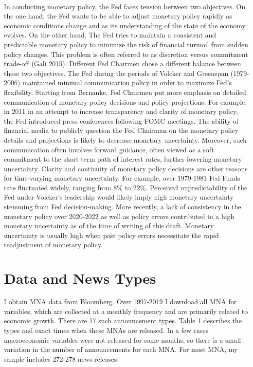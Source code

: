 \documentclass[12pt]{article}
\begin{document}
\paragraph{}
In conducting monetary policy, the Fed faces tension between two objectives. On the one hand, the Fed wants to be able to adjust monetary policy rapidly as economic conditions change and as its understanding of the state of the economy evolves. On the other hand, The Fed tries to maintain a consistent and predictable monetary policy to minimize the risk of financial turmoil from sudden policy changes. This problem is often referred to as discretion versus commitment trade-off (Gali 2015). Different Fed Chairmen chose a different balance between these two objectives. The Fed during the periods of Volcker and Greenspan (1979-2006) maintained minimal communication policy in order to maximize Fed's flexibility. Starting from Bernanke, Fed Chairmen put more emphasis on detailed communication of monetary policy decisions and policy projections. For example, in 2011 in an attempt to increase transparency and clarity of monetary policy, the Fed introduced press conferences following FOMC meetings. The ability of financial media to publicly question the Fed Chairman on the monetary policy details and projections is likely to decrease monetary uncertainty. Moreover, such communication often involves forward guidance, often viewed as a soft commitment to the short-term path of interest rates, further lowering monetary uncertainty. Clarity and continuity of monetary policy decisions are other reasons for time-varying monetary uncertainty. For example, over 1979-1981 Fed Funds rate fluctuated widely, ranging from 8\% to 22\%. Perceived unpredictability of the Fed under Volcker's leadership would likely imply high monetary uncertainty stemming from Fed decision-making. More recently, a lack of consistency in the monetary policy over 2020-2022 as well as policy errors contributed to a high monetary uncertainty as of the time of writing of this draft. Monetary uncertainty is usually high when past policy errors necessitate the rapid readjustment of monetary policy.


\section{Data and News Types} \label{sec:Model}

I obtain MNA data from Bloomberg. Over 1997-2019 I download all MNA for variables, which are collected at a monthly frequency and are primarily related to economic growth. There are 17 such announcement types. Table 1 describes the types and exact times when these MNAs are released. In a few cases macroeconomic variables were not released for some months, so there is a small variation in the number of announcements for each MNA. For most MNA, my sample includes 272-278 news releases.
\end{document}
